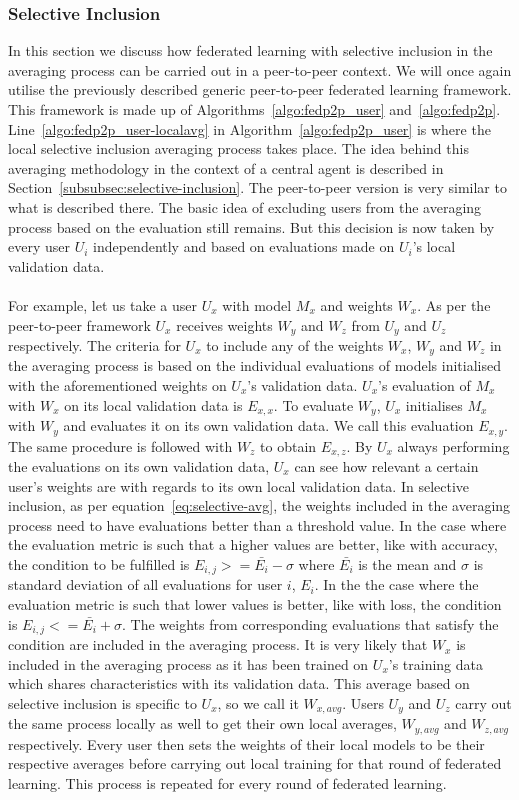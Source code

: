 \documentclass[12pt]{article}
\begin{document}
\subsubsection{Selective Inclusion}
In this section we discuss how federated learning with selective inclusion in the averaging process can be carried out in a peer-to-peer context. We will once again utilise the previously described generic peer-to-peer federated learning framework. This framework is made up of Algorithms~\ref{algo:fedp2p_user} and~\ref{algo:fedp2p}. Line~\ref{algo:fedp2p_user-localavg} in Algorithm~\ref{algo:fedp2p_user} is where the local selective inclusion averaging process takes place. The idea behind this averaging methodology in the context of a central agent is described in Section~\ref{subsubsec:selective-inclusion}. The peer-to-peer version is very similar to what is described there. The basic idea of excluding users from the averaging process based on the evaluation still remains. But this decision is now taken by every user $U_i$ independently and based on evaluations made on $U_i$'s local validation data.
\\\\
For example, let us take a user $U_x$ with model $M_x$ and weights $W_x$. As per the peer-to-peer framework $U_x$ receives weights $W_y$ and $W_z$ from $U_y$ and $U_z$ respectively. The criteria for $U_x$ to include any of the weights $W_x$, $W_y$ and $W_z$ in the averaging process is based on the individual evaluations of models initialised with the aforementioned weights on $U_x$'s validation data. $U_x$'s evaluation of $M_x$ with $W_x$ on its local validation data is $E_{x,x}$. To evaluate $W_y$, $U_x$ initialises $M_x$ with $W_y$ and evaluates it on its own validation data. We call this evaluation $E_{x,y}$. The same procedure is followed with $W_z$ to obtain $E_{x,z}$. By $U_x$ always performing the evaluations on its own validation data, $U_x$ can see how relevant a certain user's weights are with regards to its own local validation data. In selective inclusion, as per equation~\ref{eq:selective-avg}, the weights included in the averaging process need to have evaluations better than a threshold value. In the case where the evaluation metric is such that a higher values are better, like with accuracy, the condition to be fulfilled is $E_{i,j} >= \bar{E_i}-\sigma$ where $\bar{E_i}$ is the mean and $\sigma$ is standard deviation of all evaluations for user $i$, $E_i$. In the the case where the evaluation metric is such that lower values is better, like with loss, the condition is $E_{i,j} <= \bar{E_i}+\sigma$. The weights from corresponding evaluations that satisfy the condition are included in the averaging process. It is very likely that $W_x$ is included in the averaging process as it has been trained on $U_x$'s training data which shares characteristics with its validation data. This average based on selective inclusion is specific to $U_x$, so we call it $W_{x,avg}$. Users $U_y$ and $U_z$ carry out the same process locally as well to get their own local averages, $W_{y,avg}$ and $W_{z,avg}$ respectively. Every user then sets the weights of their local models to be their respective averages before carrying out local training for that round of federated learning. This process is repeated for every round of federated learning.
\end{document}
